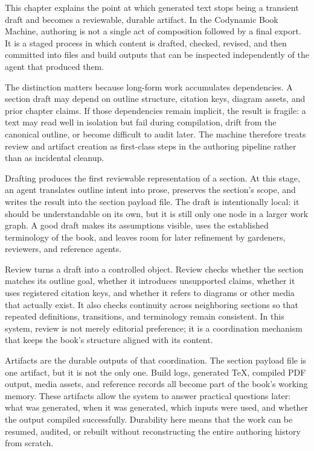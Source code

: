 This chapter explains the point at which generated text stops being a transient draft and becomes a reviewable, durable artifact. In the Codynamic Book Machine, authoring is not a single act of composition followed by a final export. It is a staged process in which content is drafted, checked, revised, and then committed into files and build outputs that can be inspected independently of the agent that produced them.

The distinction matters because long-form work accumulates dependencies. A section draft may depend on outline structure, citation keys, diagram assets, and prior chapter claims. If those dependencies remain implicit, the result is fragile: a text may read well in isolation but fail during compilation, drift from the canonical outline, or become difficult to audit later. The machine therefore treats review and artifact creation as first-class steps in the authoring pipeline rather than as incidental cleanup.

Drafting produces the first reviewable representation of a section. At this stage, an agent translates outline intent into prose, preserves the section's scope, and writes the result into the section payload file. The draft is intentionally local: it should be understandable on its own, but it is still only one node in a larger work graph. A good draft makes its assumptions visible, uses the established terminology of the book, and leaves room for later refinement by gardeners, reviewers, and reference agents.

Review turns a draft into a controlled object. Review checks whether the section matches its outline goal, whether it introduces unsupported claims, whether it uses registered citation keys, and whether it refers to diagrams or other media that actually exist. It also checks continuity across neighboring sections so that repeated definitions, transitions, and terminology remain consistent. In this system, review is not merely editorial preference; it is a coordination mechanism that keeps the book's structure aligned with its content.

Artifacts are the durable outputs of that coordination. The section payload file is one artifact, but it is not the only one. Build logs, generated \TeX{}, compiled PDF output, media assets, and reference records all become part of the book's working memory. These artifacts allow the system to answer practical questions later: what was generated, when it was generated, which inputs were used, and whether the output compiled successfully. Durability here means that the work can be resumed, audited, or rebuilt without reconstructing the entire authoring history from scratch.

